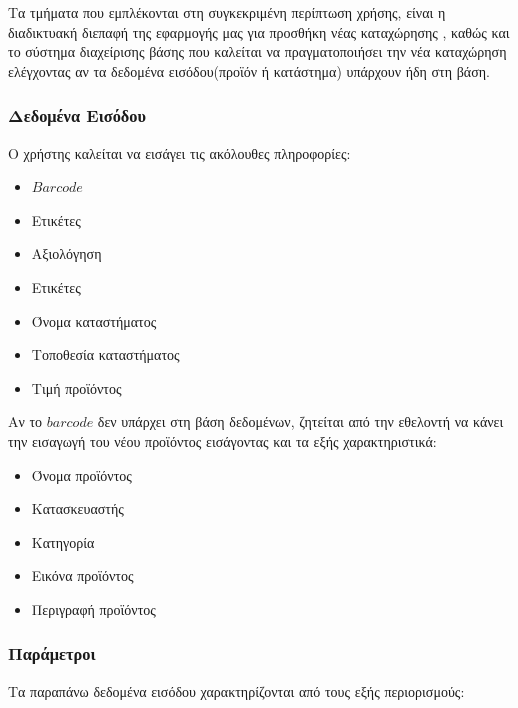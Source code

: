 \documentclass[12pt]{article}
\begin{document}
Τα τμήματα που εμπλέκονται στη συγκεκριμένη περίπτωση χρήσης, είναι η διαδικτυακή διεπαφή της εφαρμογής μας για προσθήκη νέας καταχώρησης , καθώς και το σύστημα διαχείρισης βάσης που καλείται να πραγματοποιήσει την νέα καταχώρηση ελέγχοντας αν τα δεδομένα εισόδου(προϊόν ή κατάστημα) υπάρχουν ήδη στη βάση. 

\subsubsection{Δεδομένα Εισόδου}

Ο χρήστης καλείται να εισάγει τις ακόλουθες πληροφορίες:

\begin{itemize}
\item $Barcode$
\item Ετικέτες
\item Αξιολόγηση
\item Ετικέτες
\item Όνομα καταστήματος
\item Τοποθεσία καταστήματος
\item Τιμή προϊόντος
\end{itemize}

Αν το $barcode$ δεν υπάρχει στη βάση δεδομένων, ζητείται από την εθελοντή να κάνει την εισαγωγή του νέου προϊόντος εισάγοντας και τα εξής χαρακτηριστικά:

\begin{itemize}
\item Όνομα προϊόντος
\item Κατασκευαστής
\item Κατηγορία
\item Εικόνα προϊόντος
\item Περιγραφή προϊόντος
\end{itemize}

\subsubsection{Παράμετροι}

Τα παραπάνω δεδομένα εισόδου χαρακτηρίζονται από τους εξής περιορισμούς:
\end{document}
